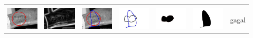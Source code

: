 \begin{table}[H]
\begin{tabular}{|m{0.7in}|m{0.7in}|m{0.7in}|m{0.7in}|m{0.7in}|m{0.7in}|m{0.7in}|}
		&  &  & & & &  \\
		\includegraphics[width=0.7in]{dataset/dataset_3/luka_kuning/ready/3_interp_init.jpg}&
		\includegraphics[width=0.7in]{dataset/dataset_3/luka_kuning/ready/3_interp_ext.jpg}&
		\includegraphics[width=0.7in]{dataset/dataset_3/luka_kuning/ready/3_interp_result.jpg}&
		\includegraphics[width=0.7in]{dataset/dataset_3/luka_kuning/ready/3_gt_r.jpg}&
		\includegraphics[width=0.7in]{dataset/dataset_3/luka_kuning/ready/3_r.jpg}&
		\includegraphics[width=0.7in]{dataset/dataset_3/luka_kuning/ready/3_interp_r.jpg}&
		gagal\\
		\hline
		

\end{tabular}
\end{table}
